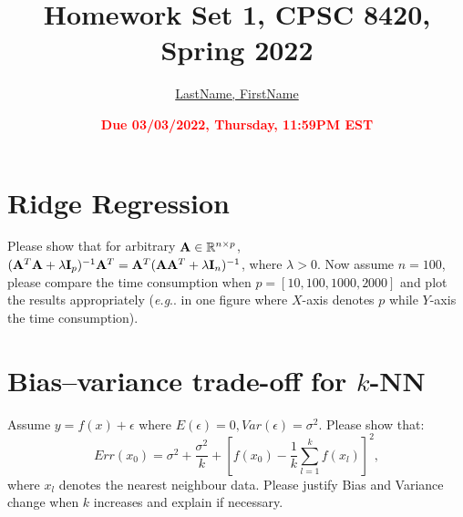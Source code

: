 \documentclass[11pt]{article}
\title{{\bf Homework Set 1, CPSC 8420, Spring 2022}}
\author{\Large\underline{LastName, FirstName}}
\date{\textbf{\Large\textcolor{red}{Due 03/03/2022, Thursday, 11:59PM EST}}}
\makeatletter
\newcommand{\R}{\mathbb{R}}
\newcommand{\minimize}{\operatorname*{minimize\ }}
\newcommand{\maximize}{\operatorname*{maximize}}
\newcommand{\vct}[1]{\mathbf{#1}}
\def \mA {\mtx{A}}
\def \mI {\mtx{I}}
\def \mU {\mtx{U}}
\def \mS {\mtx{S}}
\def \mX {\mtx{X}}
\def \vv {\vct{v}}
\def \R {\mathbb{R}} $
\DeclareRobustCommand\onedot{\futurelet\@let@token\@onedot}
\def\@onedot{\ifx\@let@token.\else.\null\fi\xspace}
\def\eg{\emph{e.g}\onedot} \def\Eg{\emph{E.g}\onedot}
\makeatother
\begin{document}
\maketitle

\section*{Ridge Regression}
Please show that for arbitrary $\mA\in\R^{n\times p}$, $(\mA^T\mA+\lambda\mI_p)^{-1}\mA^T=\mA^T(\mA\mA^T+\lambda\mI_n)^{-1}$, where $\lambda>0$. Now assume $n=100$, please compare the time consumption when $p=[10,100,1000,2000]$ and plot the results appropriately (\eg in one figure where $X$-axis denotes $p$ while $Y$-axis the time consumption).
\vspace{4cm}

\section*{Bias–variance trade-off for $k$-NN}
Assume $y=f(x)+\epsilon$ where $E(\epsilon)=0, Var(\epsilon)=\sigma^2$. Please show that:
\begin{equation}
	Err(x_0)=\sigma^2+\frac{\sigma^2}{k}+[f(x_0)-\frac{1}{k}\sum_{l=1}^{k}f(x_l)]^2,
\end{equation}
where $x_l$ denotes the nearest neighbour data.  Please justify Bias and Variance change when $k$ increases and explain if necessary.
\vspace{4cm}
\end{document}
